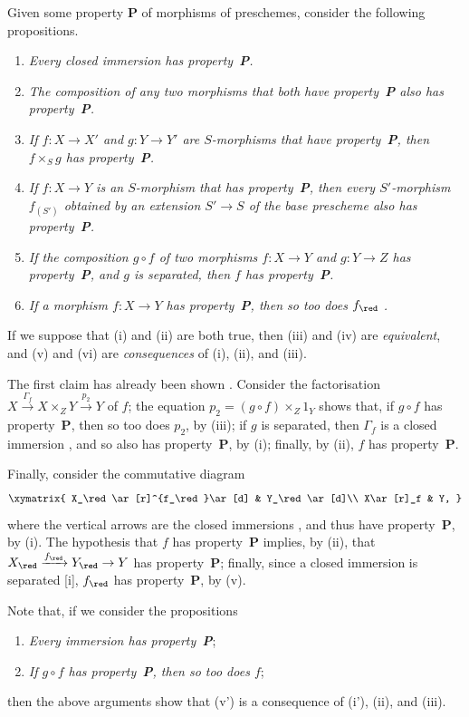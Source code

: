 \begin{remark}[5.5.12]
\label{I.5.5.12}
Given some property \textbf{P} of morphisms of preschemes, consider the following propositions.
\begin{enumerate}
  \item[(i)] \emph{Every closed immersion has property~\textbf{P}.}
  \item[(ii)] \emph{The composition of any two morphisms that both have property~\textbf{P} also has property~\textbf{P}.}
  \item[(iii)] \emph{If $f:X\to X'$ and $g:Y\to Y'$ are $S$-morphisms that have property~\textbf{P}, then $f\times_S g$ has property~\textbf{P}.}
  \item[(iv)] \emph{If $f:X\to Y$ is an $S$-morphism that has property~\textbf{P}, then every $S'$-morphism $f_{(S')}$ obtained by an extension $S'\to S$ of the base prescheme also has property~\textbf{P}.}
  \item[(v)] \emph{If the composition $g\circ f$ of two morphisms $f:X\to Y$ and $g:Y\to Z$ has property~\textbf{P}, and $g$ is separated, then $f$ has property~\textbf{P}.}
  \item[(vi)] \emph{If a morphism $f:X\to Y$ has property~\textbf{P}, then so too does $f_\red$ .}
\end{enumerate}
If we suppose that (i) and (ii) are both true, then (iii) and (iv) are \emph{equivalent}, and (v) and (vi) are \emph{consequences} of (i), (ii), and (iii).

The first claim has already been shown .
Consider the factorisation  $X\xrightarrow{\Gamma_f}X\times_Z Y\xrightarrow{p_2}Y$ of $f$;
the equation $p_2=(g\circ f)\times_Z 1_Y$ shows that, if $g\circ f$ has property~\textbf{P}, then so too does $p_2$, by (iii);
if $g$ is separated, then $\Gamma_f$ is a closed immersion , and so also has property~\textbf{P}, by (i);
finally, by (ii), $f$ has property~\textbf{P}.

Finally, consider the commutative diagram
\[
  \xymatrix{
    X_\red\ar[r]^{f_\red}\ar[d] &
    Y_\red\ar[d]\\
    X\ar[r]_f &
    Y,
  }
\]
where the vertical arrows are the closed immersions , and thus have property~\textbf{P}, by (i).
The hypothesis that $f$ has property~\textbf{P} implies, by (ii), that $X_\red\xrightarrow{f_\red}Y_\red\to Y$ has property~\textbf{P};
finally, since a closed immersion is separated [i], $f_\red$ has property~\textbf{P}, by (v).

Note that, if we consider the propositions
\begin{enumerate}
  \item[(i')] \emph{Every immersion has property~\textbf{P}};
  \item[(v')] \emph{If $g\circ f$ has property~\textbf{P}, then so too does $f$};
\end{enumerate}
then the above arguments show that (v') is a consequence of (i'), (ii), and (iii).
\end{remark}

